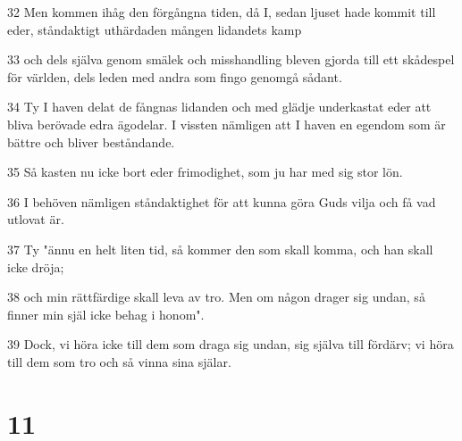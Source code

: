 \par 32 Men kommen ihåg den förgångna tiden, då I, sedan ljuset hade kommit till eder, ståndaktigt uthärdaden mången lidandets kamp
\par 33 och dels själva genom smälek och misshandling bleven gjorda till ett skådespel för världen, dels leden med andra som fingo genomgå sådant.
\par 34 Ty I haven delat de fångnas lidanden och med glädje underkastat eder att bliva berövade edra ägodelar. I vissten nämligen att I haven en egendom som är bättre och bliver beståndande.
\par 35 Så kasten nu icke bort eder frimodighet, som ju har med sig stor lön.
\par 36 I behöven nämligen ståndaktighet för att kunna göra Guds vilja och få vad utlovat är.
\par 37 Ty "ännu en helt liten tid, så kommer den som skall komma, och han skall icke dröja;
\par 38 och min rättfärdige skall leva av tro. Men om någon drager sig undan, så finner min själ icke behag i honom".
\par 39 Dock, vi höra icke till dem som draga sig undan, sig själva till fördärv; vi höra till dem som tro och så vinna sina själar.

\chapter{11}

